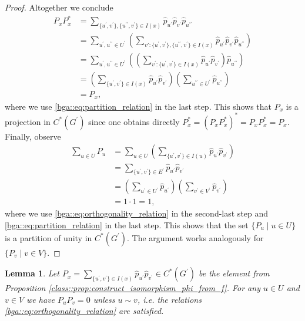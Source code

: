 \documentclass[a4paper]{amsart}
\newtheorem{lemma}[thm]{Lemma}
\begin{document}
\begin{proof}
    Altogether we conclude
    \begin{align*}
        P_x P_x^\ast
        &=  \sum_{\{u^\prime, v^\prime\}, \{u^{\prime\prime}, v^{\prime}\} \in I(x)} \hat{p}_{u^\prime} \hat{p}_{v^\prime} \hat{p}_{u^{\prime\prime}} \\
        &= \sum_{u^\prime, u^{\prime\prime} \in U^\prime} \left( \sum_{v': \{u^\prime, v^\prime\}, \{u^{\prime\prime}, v^{\prime}\} \in I(x)} \hat{p}_{u^\prime} \hat{p}_{v^\prime} \hat{p}_{u^{\prime\prime}} \right) \\
        &= \sum_{u^\prime, u^{\prime\prime} \in U^\prime} \left( \left( \sum_{v^\prime: \{u^\prime, v^\prime\} \in I(x)} \hat{p}_{u^\prime} \hat{p}_{v^\prime} \right) \hat{p}_{u^{\prime\prime}} \right) \\
        &= \left( \sum_{\{u^\prime, v^\prime\} \in I(x)} \hat{p}_{u^\prime} \hat{p}_{v^\prime} \right) \left( \sum_{u^{\prime\prime} \in U^\prime} \hat{p}_{u^{\prime\prime}} \right) \\
        &= P_x,
    \end{align*}
    where we use \eqref{bga::eq:partition_relation} in the last step. This shows that $P_x$ is a projection in $C^\ast(G^\prime)$ since one obtains directly $P_x^\ast = \left( P_x P_x^\ast \right)^\ast = P_x P_x^\ast = P_x$.
    Finally, observe
    \begin{align*}
        \sum_{u \in U} P_u 
            &= \sum_{u \in U} \left( \sum_{\{u^\prime, v^\prime\} \in I(u)} \hat{p}_{u^\prime} \hat{p}_{v^\prime} \right) \\
            &= \sum_{\{u^\prime, v^\prime\} \in E^\prime} \hat{p}_{u^\prime} \hat{p}_{v^\prime} \\
            &= \left( \sum_{u^\prime \in U^\prime} \hat{p}_{u^\prime} \right) \left( \sum_{v^\prime \in V^\prime} \hat{p}_{v^\prime} \right) \\
            &= 1 \cdot 1 = 1,
    \end{align*}
    where we use \eqref{bga::eq:orthogonality_relation} in the second-last step and \eqref{bga::eq:partition_relation} in the last step.
    This shows that the set $\{P_u \mid u \in U\}$ is a partition of unity in $C^\ast(G^\prime)$. The argument works analogously for $\{P_v \mid v \in V\}$.
\end{proof}

\begin{lemma} 
    \label{class::lemma:Px_are_orthogonal}
    Let $P_x = \sum_{\{u^\prime, v^\prime\} \in I(x)} \hat{p}_{u^\prime} \hat{p}_{v^\prime} \in C^\ast(G^\prime)$ be the element from Proposition \ref{class::prop:construct_isomorphism_phi_from_f}. For any $u \in U$ and $v \in V$ we have $P_u P_v = 0$ unless $u \sim v$, i.e. the relations \eqref{bga::eq:orthogonality_relation} are satisfied.
\end{lemma}
\end{document}
